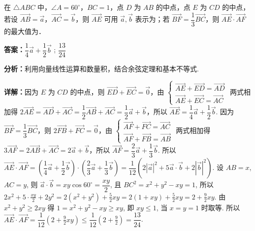 \begin{question}[points=5]
在 $\triangle ABC$ 中，$\angle A = 60^\circ$，$BC = 1$，点 $D$ 为 $AB$ 的中点，点 $E$ 为 $CD$ 的中点，若设 $\overrightarrow{AB} = \vec{a}$，$\overrightarrow{AC} = \vec{b}$，则 $\overrightarrow{AE}$ 可用 $\vec{a}, \vec{b}$ 表示为；若 $\overrightarrow{BF} = \dfrac{1}{3} \overrightarrow{BC}$，则 $\overrightarrow{AE} \cdot \overrightarrow{AF}$ 的最大值为．
\begin{solution}
\textbf{答案：}$\dfrac{1}{4}\vec{a} + \dfrac{1}{2}\vec{b}$ ; $\dfrac{13}{24}$

\textbf{分析：}利用向量线性运算和数量积，结合余弦定理和基本不等式.

\textbf{详解：}因为 $E$ 为 $CD$ 的中点，则 $\overrightarrow{ED} + \overrightarrow{EC} = \vec{0}$，由 $\begin{cases} \overrightarrow{AE} + \overrightarrow{ED} = \overrightarrow{AD} \\ \overrightarrow{AE} + \overrightarrow{EC} = \overrightarrow{AC} \end{cases}$ 两式相加得 $2\overrightarrow{AE} = \overrightarrow{AD} + \overrightarrow{AC} = \dfrac{1}{2}\overrightarrow{AB} + \overrightarrow{AC} = \dfrac{1}{2}\vec{a} + \vec{b}$，所以 $\overrightarrow{AE} = \dfrac{1}{4}\vec{a} + \dfrac{1}{2}\vec{b}$. 因为 $\overrightarrow{BF} = \dfrac{1}{3}\overrightarrow{BC}$，则 $2\overrightarrow{FB} + \overrightarrow{FC} = \vec{0}$，由 $\begin{cases} \overrightarrow{AF} + \overrightarrow{FC} = \overrightarrow{AC} \\ \overrightarrow{AF} + \overrightarrow{FB} = \overrightarrow{AB} \end{cases}$ 两式相加得 $3\overrightarrow{AF} = 2\overrightarrow{AB} + \overrightarrow{AC} = 2\vec{a} + \vec{b}$，所以 $\overrightarrow{AF} = \dfrac{2}{3}\vec{a} + \dfrac{1}{3}\vec{b}$. 所以 $\overrightarrow{AE} \cdot \overrightarrow{AF} = \left(\dfrac{1}{4}\vec{a} + \dfrac{1}{2}\vec{b}\right) \cdot \left(\dfrac{2}{3}\vec{a} + \dfrac{1}{3}\vec{b}\right) = \dfrac{1}{12}(2|\vec{a}|^2 + 5\vec{a}\cdot\vec{b} + 2|\vec{b}|^2)$. 设 $AB = x$, $AC = y$, 则 $\vec{a}\cdot\vec{b} = xy\cos60^\circ = \dfrac{xy}{2}$, 且 $BC^2 = x^2 + y^2 - xy = 1$, 所以 $2x^2 + 5\cdot\frac{xy}{2} + 2y^2 = 2(x^2 + y^2) + \frac{5}{2}xy = 2(1+xy) + \frac{5}{2}xy = 2 + \frac{9}{2}xy$. 由 $x^2 + y^2 \ge 2xy$ 得 $1 = x^2 + y^2 - xy \ge xy$, 即 $xy \le 1$, 当 $x = y = 1$ 时取等. 所以 $\overrightarrow{AE} \cdot \overrightarrow{AF} = \dfrac{1}{12}\left(2 + \frac{9}{2}xy\right) \le \dfrac{1}{12}\left(2 + \frac{9}{2}\right) = \dfrac{13}{24}$.
\end{solution}
\end{question}

